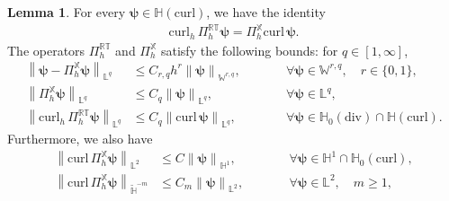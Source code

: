 \documentclass[11pt, reqno]{amsart}
\theoremstyle{definition}
\newtheorem{lemma}[theorem]{Lemma}
\numberwithin{equation}{section}
\newcommand{\curl}{\mathrm{curl}\,}
\newcommand{\bff}{\boldsymbol}
\newcommand{\bb}{\mathbb}
\newcommand{\norm}[2]{\left\|{#1}\right\|_{#2}}
\newcommand{\hcurl}{\mathbb{H}(\mathrm{curl})}
\newcommand{\hzerodiv}{\mathbb{H}_0(\mathrm{div})}
\newcommand{\hzerocurl}{\mathbb{H}_0(\mathrm{curl})}
\newcommand{\curlh}{\mathrm{curl}_h\,}
\begin{document}
\begin{lemma}
	For every $\bff{\psi}\in \hcurl$, we have the identity
	\begin{align}\label{equ:conv curlh projection}
		\curlh \Pi_h^{\bb{RT}}\bff{\psi}=\Pi_h^{\bb{X}}\curl\bff{\psi}.
	\end{align}
	The operators $\Pi_h^{\bb{RT}}$ and $\Pi_h^{\bb{X}}$ satisfy the following bounds: for $q\in [1,\infty]$,
	\begin{subequations}
		\begin{alignat}{2}
			\label{equ:conv magnetic projection estimates}
			\norm{\bff{\psi}-\Pi_h^{\bb{X}} \bff{\psi}}{\bb{L}^q} 
			&\leq C_{r,q} h^r \norm{\bff{\psi}}{\bb{W}^{r,q}}, \qquad &&\forall \bff{\psi}\in \bb{W}^{r,q}, \quad r\in \{0,1\},
			\\
			\label{equ:stab magnetic projection}
			\norm{\Pi_h^{\bb{X}} \bff{\psi}}{\bb{L}^q}
			&\leq
			C_q \norm{\bff{\psi}}{\bb{L}^q}, \qquad &&\forall \bff{\psi}\in \bb{L}^q,
			\\
			\label{equ:conv magnetic projection Linfty}
			\norm{\curlh\Pi_h^{\bb{RT}}\bff{\psi}}{\bb{L}^q} &\le C_q \norm{\curl \bff{\psi}}{\bb{L}^q}, \qquad &&\forall \bff{\psi}\in\hzerodiv \cap \hcurl.
		\end{alignat}
	\end{subequations}
	Furthermore, we also have
	\begin{subequations}
		\begin{alignat}{2}
			\label{equ:PiX curl H1 stability}
			\norm{\curl\Pi_h^{\bb X}\bff \psi}{\bb L^2}
			&\le
			C\norm{\bff \psi}{\bb H^1},
			\qquad
			&&\forall\bff \psi\in\bb H^1 \cap\hzerocurl,
			\\
			\label{equ:PiX negative curl stability}
			\norm{\curl\Pi_h^{\bb X}\bff \psi}{\widetilde{\bb H}^{-m}}
			&\le
			C_m \norm{\bff \psi}{\bb L^2},
			\qquad
			&&\forall\bff \psi\in\bb L^2, \quad m\geq 1,
		\end{alignat}
	\end{subequations}
\end{lemma}
\end{document}
